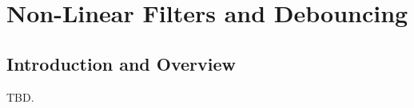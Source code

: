 \chapter{Non-Linear Filters and Debouncing}
\label{cnlf0}

\section{Introduction and Overview}
\label{cnlf0:siov0}

TBD.

